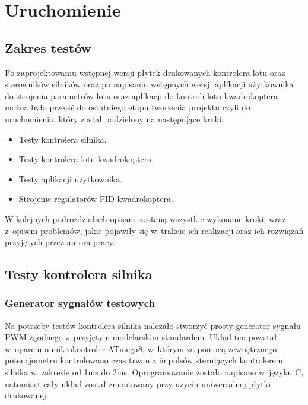 
\chapter{Uruchomienie} %

\label{Chapter7} %


\section{Zakres testów}

Po zaprojektowaniu wstępnej wersji płytek drukowanych kontrolera lotu oraz sterowników silników oraz po napisaniu wstępnych wersji aplikacji użytkownika do strojenia parametrów lotu oraz aplikacji do kontroli lotu kwadrokoptera można było przejść do ostatniego etapu tworzenia projektu czyli do uruchomienia, który został podzielony na następujące kroki:

\begin{itemize}
	\item Testy kontrolera silnika.
	\item Testy kontrolera lotu kwadrokoptera.
	\item Testy aplikacji użytkownika.
	\item Strojenie regulatorów PID kwadrokoptera.
\end{itemize} 

W kolejnych podrozdziałach opisane zostaną wszystkie wykonane kroki, wraz z~opisem problemów, jakie pojawiły się w~trakcie ich realizacji oraz ich rozwiązań przyjętych przez autora pracy.

\section{Testy kontrolera silnika}

\subsection{Generator sygnałów testowych}

Na potrzeby testów kontrolera silnika należało stworzyć prosty generator sygnału PWM zgodnego z~przyjętym modelarskim standardem. Układ ten powstał w~oparciu o mikrokontroler ATmega8, w~którym za pomocą zewnętrznego potencjometru kontrolowano czas trwania impulsów sterujących kontrolerem silnika w~zakresie od 1ms do 2ms. Oprogramowanie zostało napisane w~języku C, natomiast cały układ został zmontowany przy użyciu uniwersalnej płytki drukowanej.

